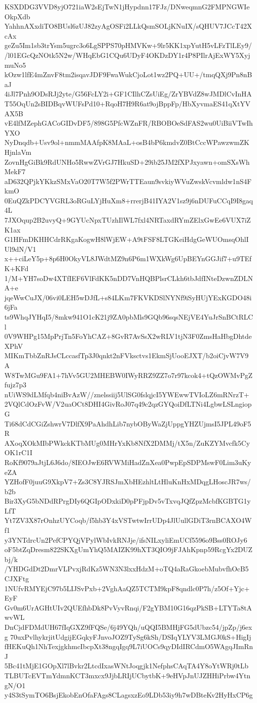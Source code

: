 KSXDDG3VVD8yjO721iaW2sEjTwN1jHypdnn17FJz/DNweqmnG2FMPNGWIeOkpXdb
YahhnAXxdiTO8BUsl6zUJ82zyAgOSFi2LLkQsmSOLjKNuIX/sQHUV7JCcT42XcAx
geZu5Im1sb3trYsm5ugrc3o6LgSPPS70pHMVKw+9lr5KK1xpYutH5vLFzTlLEy9/
/l01EGcQzNOtk5N2w/WHqEbG1CQu6UDyF4OKDzDY1r4P8PIlrAjExWY5XyjmuNo5
kOzw1lfE4mZnvF8tm2isqavJDF9FwaWukCjoLot1wz2PQ+UU+/tmqQXj9Pn8nBaJ
4iJl7Pnh9ODsRJj2yte/G56FcLY2i+GF1CIlhCZsUiEg/ZrYBVdZ8wJMDlCvInHA
T55OqUn2sBIDBqvWUFsPd10+RqoH7H9R6at9ojBppFp/HbXyvmaES41qXtYVAX5B
vE4lfMZephGACoGIDvDF5/898G5PfcWZnFR/RBOBOeSdFAS2wu0UiBiiVTwIhYXO
NyDnqdb+Usv9ol+nmmMAAfpK8MAaL+osB4bP6kmdvZ0BtCccWPawzwmZKHjnlaVm
ZovnHgGiBk9RdUNHo5RwwZVrGJ7HkuSD+29ib25JM2fXPJxyawn+omSXsWhMekF7
aD632QPjkYKkzSMxVaO20T7W5f2PWrTTEaun9svkiyWVuZwskVcvmldw1nS4FkmO
0EuQZkPDCYVGRL3oRGuLYjHuXm8+rrerjB41IYA2V1sz9j6nDUFuCCqI9I8gaq4L
7JXOqup2B2uvyQ+9GYUcNpxTUzhIlWL7fxl4NRTaxdRYmZElxGwEe6VUX7iZK1ax
G1HFmDKHHCdrRKgaKogwH8lWjEW+A9tFSF8LTGKeiHdgGeWUOmsqOhlIUl9dN/V1
x++ciLeY5p+8p6H0OkyVL8JWdtMZ9n6P6m1WXkWg6UpBEYnGGJif7+u9TEfK+KFd
1/M+YH7soDw4XTfIEF6VlFdKK5nDD7VnHQBPlsrCLkh6tbJdfINteDzwnZDLNA+e
jqeWwCuJX/06vi0LEH5wDJfL+s84LKm7FKVKDSlNYNf9iSyHUjYExKGDO48i6jFa
ts9WhqJYHqI5/8mkw941O1cK21j9ZA0pbMls9GQb96sqsNEjVE4YuJrSnBCtRLCl
0V9WHPg15MpPrjTn5FoYhCAZ+8GvR7AvSsX2wRLV1tjN3F0ZmsHaHbgDhtdeXPhV
MIKmTbbZnRJsCLccasfTp3J0qnkt2nFVksctvs1EkmSjUooEJXT/b2oiCjvW7V9A
W8TwMGu9FA1+7hVv5GU2MHEBW0IWyRRZ9ZZ7o7r97kcok4+tQzOWMvPgZfujz7p3
nUiWS9dLMfqb4niBvAzW//znelssiij5UlSG0fslqjcI5YWEwwTVIoLZ6mRNrzT+
2VQlCdOzFvW/V2uaOCt8DHI4GivRoJ07q49c2qzGYQoiDfLTNi4LgbwLSLngiopG
Ti68dCdCGiZshwrV7DlfX9PaAhdhLib7nybOByWaZjUppgYHZUjmsI5JPL49oF5R
AXoqXOkMIbPWkckKTbMUg0MHrYxKb8NfX2DMMj/tX5n/ZuKZYMvcfk5CyOK1rC1I
RoKf9079aJtjL6J6do/8IEOJwE6RVWMiHadZnXea0PwpEpSDPMswF0Lim3uKyeZA
YZHofF0juuG9XkpV7+Zs3C8YJRSJmXbHEzhltLtHluKnHxMDqgLHoscJR7ws/b2b
Bir3XyG5bNDdRPrgDIy6QGIpODxkiD0pPFjpDv5vTxvqJQfZpzMcbfKGBTG1yLfT
Yt7ZV3X87rOnhzUYCoqb/f5hb3Y4xVSTwtwIrrUDp4JlUullGDiT3rnBCAXO4Wf1
y3YNTdrcUn2PefCPYQjVPylWbIvkRNJje/ifsNILxyliEmUCf5596o9Bss0ROJy6
oF5btZqDresm822SKXgUmYhQ5MAIZK99hXT3QIO9jFJAhKpnp59RcgYx2DUZbj/k
/YHDGdDt2DmrVLPvxjRdKz5WN3N3lxxHdzM+oTQ4aRaGkoebMubvfhOcB5CJXFtg
1NUfvRMYEjC97b5LIJSvPxb+2VghAaQZ5TCTM9kpF8qndlc0P7h/z5Of+Yjc+EyF
Gv0m6UrAGHtUIv2QUEfhbDk8PvVyvRnqi/F2gYBM10G16qzPkSB+LTYTa8tAwvWL
DnCjdFDMdUH67fIqGXZ9fFQSe/6j49YQh/uQQI5BMHjFG5dUbzc54/jpZp/j6exg
70uxPvlhykrjitUdgijEGqkyFJnvoJOZ9TySg6kSh/DSIqYLYV3LMGJ0kS+HigIj
fHEKuQh1NhTexjgkhmcIbcpXt38ngqIgq9L7iUOCs9qyDIdIRCdmO5WAgqJImRnJ
5Bc41tMjE1GOpXl7lBvkr2LtcdIxasWNtJoqgjk1NefphsCAqTA4Y8oYtWRj0tLb
TLBUTcEVTmYdmnKCT3mxcx9JjbLRIjUCbytbK+9eHVpJnUJZHHiPrbw4YtngN/O1
y4S3tSymTO6BsjEkobEnOfaFAgs8CLagsxzEo9LDb53iy9h7wDBteKv2HyHxCP6g
